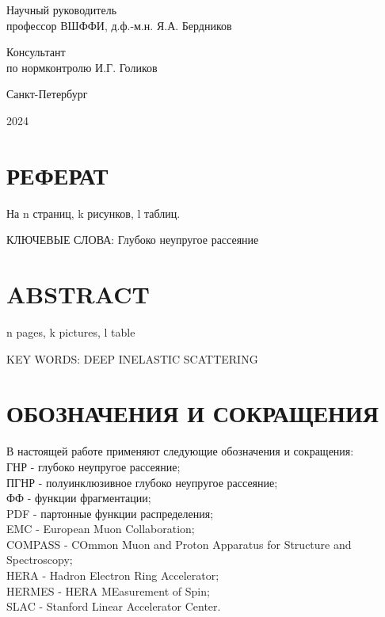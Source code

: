 \begin{titlepage}
\begin{flushleft}
Научный руководитель\\
профессор ВШФФИ, д.ф.-м.н.
\hspace{0.1 cm} \hspace{1.8 cm} 
\hfill  {Я.А. Бердников}
\vspace{0.5cm}

Консультант \\
по нормконтролю \hspace{2.1 cm} \hspace{2 cm} \hfill  {И.Г. Голиков}
\end{flushleft}


\begin{center}
	Санкт-Петербург
\end{center}
\begin{center}
    2024
\end{center}
\newpage
\pagestyle{empty}
\section*{РЕФЕРАТ}
\begin{center}
    На n страниц, k рисунков, l таблиц.
\end{center}
КЛЮЧЕВЫЕ СЛОВА: Глубоко неупругое рассеяние
\\


\section*{ABSTRACT}
\begin{center}
    n pages, k pictures, l table
\end{center} 
KEY WORDS: DEEP INELASTIC SCATTERING
\\

\newpage
\section*{ОБОЗНАЧЕНИЯ И СОКРАЩЕНИЯ}

В настоящей работе применяют следующие обозначения и сокращения: \\
ГНР - глубоко неупругое рассеяние; \\
ПГНР - полуинклюзивное глубоко неупругое рассеяние; \\
ФФ - функции фрагментации; \\
PDF - партонные функции распределения; \\ 
EMC - European Muon Collaboration; \\
COMPASS - COmmon Muon and Proton Apparatus for Structure and
Spectroscopy; \\
HERA - Hadron Electron Ring Accelerator; \\
HERMES - HERA MEasurement of Spin; \\
SLAC - Stanford Linear Accelerator Center.


\end{titlepage}	

